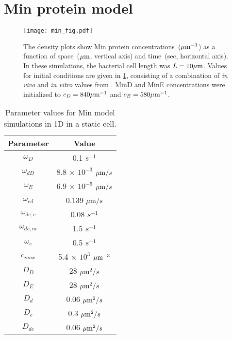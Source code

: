 \section{Min protein model}

\begin{figure}[htbp]
\centering
\texttt{[image: min\_fig.pdf]}
\caption{The density plots show Min protein concentrations~($\mu {\rm m}^{-1}$) as a function of space~($\mu {\rm m}$, vertical axis) and time~(sec, horizontal axis).  In these simulations, the bacterial cell length was $L=10 \mu {\rm m}$. Values for initial conditions are given in \cref{tab:min_model}, consisting of a combination of {\it in vivo} and {\it in vitro} values from \cite{Bonny2013}. MinD and MinE concentrations were initialized to $c_D=840 \mu {\rm m}^{-1}$ and $c_E=580 \mu {\rm m}^{-1}$.}
\label{fig:min_model}
\end{figure}

\begin{table}[htbp]
\centering
	\begin{tabular}{| c | c |}
		\hline
		Parameter & Value \\
		\hline
		$\omega_D$ & 0.1 $s^{-1}$ \\
		$\omega_{dD}$ & 8.8 $\times$ $10^{-3}$ $\mu {\rm m}/s$ \\
		$\omega_E$ & 6.9 $\times$ $10^{-5}$ $\mu {\rm m}/s$  \\
		$\omega_{ed}$ & 0.139 $\mu {\rm m}/s$ \\
		$\omega_{de,c}$ & 0.08 $s^{-1}$ \\
		$\omega_{de, m}$ & 1.5 $s^{-1}$ \\
		$\omega_e$ & 0.5 $s^{-1}$\\
		$c_{max}$ & 5.4 $\times$ $10^3$ $\mu {\rm m}^{-3}$ \\
		$D_D$ & 28 $\mu {\rm m}^2/s$ \\
		$D_E$ & 28 $\mu {\rm m}^2/s$ \\
		$D_d$ &0.06 $\mu {\rm m}^2/s$ \\
		$D_e$ & 0.3 $\mu {\rm m}^2/s$ \\
		$D_{de}$ &0.06 $\mu {\rm m}^2/s$ \\
	\hline
	\end{tabular}
\caption{Parameter values for Min model simulations in 1D in a static cell.
}\label{tab:min_model} 
\end{table}

